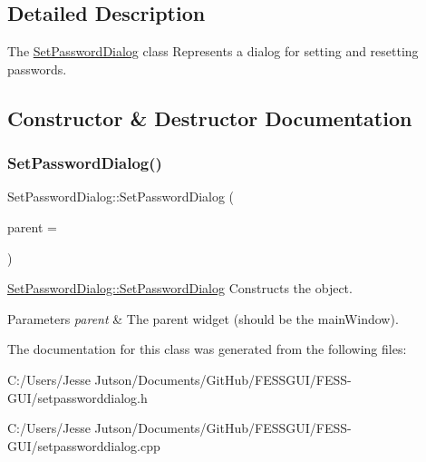 \subsection{Detailed Description}
The \hyperlink{class_set_password_dialog}{Set\+Password\+Dialog} class Represents a dialog for setting and resetting passwords. 

\subsection{Constructor \& Destructor Documentation}
\hypertarget{class_set_password_dialog_a6c0f4e419cde5431401dd4deeccb1a54}{}\label{class_set_password_dialog_a6c0f4e419cde5431401dd4deeccb1a54} 
\subsubsection{\texorpdfstring{Set\+Password\+Dialog()}{SetPasswordDialog()}}
{\footnotesize\ttfamily Set\+Password\+Dialog\+::\+Set\+Password\+Dialog (\begin{DoxyParamCaption}\item[{Q\+Widget $\ast$}]{parent = {} }\end{DoxyParamCaption})\hspace{0.3cm}{\ttfamily [explicit]}}



\hyperlink{class_set_password_dialog_a6c0f4e419cde5431401dd4deeccb1a54}{Set\+Password\+Dialog\+::\+Set\+Password\+Dialog} Constructs the object. 


\begin{DoxyParams}{Parameters}
{\em parent} & The parent widget (should be the main\+Window). \\
\hline
\end{DoxyParams}


The documentation for this class was generated from the following files\+:\begin{DoxyCompactItemize}
\item 
C\+:/\+Users/\+Jesse Jutson/\+Documents/\+Git\+Hub/\+F\+E\+S\+S\+G\+U\+I/\+F\+E\+S\+S-\/\+G\+U\+I/setpassworddialog.\+h\item 
C\+:/\+Users/\+Jesse Jutson/\+Documents/\+Git\+Hub/\+F\+E\+S\+S\+G\+U\+I/\+F\+E\+S\+S-\/\+G\+U\+I/setpassworddialog.\+cpp\end{DoxyCompactItemize}
